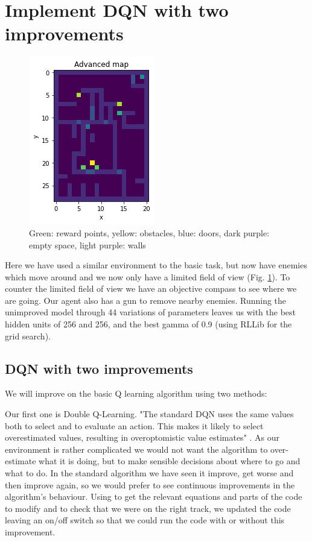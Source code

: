 \documentclass[a4pape, 11pt, english]{article}
\begin{document}
\section{Implement DQN with two improvements}
\begin{figure}[h!]
	\begin{center}
		\includegraphics{img/advanced_map.png}
		\caption{Green: reward points, yellow: obstacles, blue: doors, dark purple: empty space, light purple: walls}
		\label{fig:advanced_map}
	\end{center}
\end{figure}

Here we have used a similar environment to the basic task, but now have enemies which move around and we now only have a limited field of view (Fig. \ref{fig:advanced_map}). To counter the limited field of view we have an objective compass to see where we are going. Our agent also has a gun to remove nearby enemies. Running the unimproved model through 44 variations of parameters leaves us with the best hidden units of 256 and 256, and the best gamma of 0.9 (using RLLib for the grid search).

\subsection{DQN with two improvements}
We will improve on the basic Q learning algorithm using two methods:

Our first one is Double Q-Learning. "The standard DQN uses the same values both to select and to evaluate an action. This makes it likely to select overestimated values, resulting in overoptomistic value estimates" \citep[p. 2]{van_hasselt_deep_2016}. As our environment is rather complicated we would not want the algorithm to over-estimate what it is doing, but to make sensible decisions about where to go and what to do. In the standard algorithm we have seen it improve, get worse and then improve again, so we would prefer to see continuous improvements in the algorithm's behaviour. Using \citep[p. 2, 4]{van_hasselt_deep_2016} to get the relevant equations and parts of the code to modify and \citep{hennis_double_2019} to check that we were on the right track, we updated the code leaving an on/off switch so that we could run the code with or without this improvement.
\end{document}
